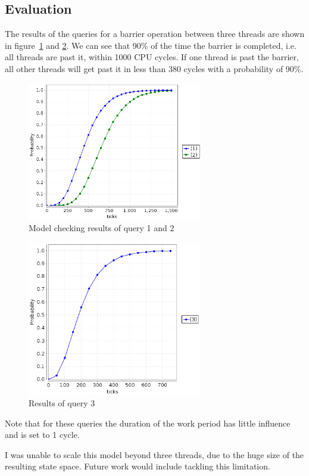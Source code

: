 \documentclass[a4paper, 10pt]{article}
\begin{document}
\subsection{Evaluation}
The results of the queries for a barrier operation between three threads are shown in figure~\ref{fig:one-and-all} and \ref{fig:one2all}. We can see that 90\% of the time the barrier is completed, i.e. all threads are past it, within 1000 CPU cycles. If one thread is past the barrier, all other threads will get past it in less than 380 cycles with a probability of 90\%.
\begin{figure}[htbp]
	\centering
	\includegraphics[width=3in]{one-and-all}
	\caption{Model checking results of query 1 and 2}
	\label{fig:one-and-all}
\end{figure}
\begin{figure}[htbp]
	\centering
	\includegraphics[width=3in]{one2all}
	\caption{Results of query 3}
	\label{fig:one2all}
\end{figure}

Note that for these queries the duration of the work period has little influence and is set to 1 cycle.

I was unable to scale this model beyond three threads, due to the huge size of the resulting state space. Future work would include tackling this limitation.
\end{document}
